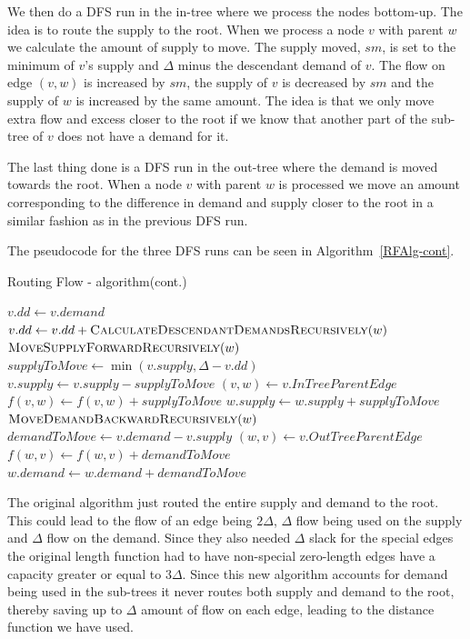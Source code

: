 We then do a DFS run in the in-tree where we process the nodes bottom-up. The idea is to route the supply to the root.
When we process a node $v$ with parent $w$ we calculate the amount of supply to move. The supply moved, $sm$, is set to 
the minimum of $v$'s supply and $\Delta$ minus the descendant demand of $v$. The flow on edge $(v,w)$ is increased by $sm$,
the supply of $v$ is decreased by $sm$ and the supply of $w$ is increased by the same amount. The idea is that
we only move extra flow and excess closer to the root if we know that another part of the sub-tree of $v$ does not have
a demand for it.

The last thing done is a DFS run in the out-tree where the demand is moved towards the root. When a node $v$ with parent $w$
is processed we move an amount corresponding to the difference in demand and supply closer to the root in a
similar fashion as in the previous DFS run.

The pseudocode for the three DFS runs can be seen in Algorithm~\ref{RFAlg-cont}.

\begin{algorithm}
\caption{Routing Flow - algorithm(cont.)}\label{RFAlg-cont}
\begin{algorithmic}[1]
\Statex
{}
	\State{}
	\State{}
	\State{}
\EndProcedure
\Statex
{}
	\State $v.dd \gets v.demand$
		\State $v.dd \gets v.dd + \Call{CalculateDescendantDemandsRecursively}{w}$
	\EndFor
\EndFunction
\Statex
{}
		\State $\Call{MoveSupplyForwardRecursively}{w}$
	\EndFor
	\State $supplyToMove \gets \min{(v.supply, \Delta - v.dd)}$
	\State $v.supply \gets v.supply - supplyToMove$
	\State $(v,w) \gets v.InTreeParentEdge$
	\State $f(v,w) \gets f(v,w) + supplyToMove$
	\State $w.supply \gets w.supply + supplyToMove$
\EndProcedure
\Statex
{}
		\State $\Call{MoveDemandBackwardRecursively}{w}$
	\EndFor
	\State $demandToMove \gets v.demand - v.supply$
	\State $(w,v) \gets v.OutTreeParentEdge$
	\State $f(w,v) \gets f(w,v) + demandToMove$
	\State $w.demand \gets w.demand + demandToMove$
\EndProcedure
\end{algorithmic}
\end{algorithm}
The original algorithm just routed the entire supply and demand to the root. This could lead to the flow of an edge being $2\Delta$, 
$\Delta$ flow being used on the supply and $\Delta$ flow on the demand. Since they also needed $\Delta$ slack for the special edges
the original length function had to have non-special zero-length edges have a capacity greater or equal to $3\Delta$. Since this new
algorithm accounts for demand being used in the sub-trees it never routes both supply and demand to the root, thereby saving
up to $\Delta$ amount of flow on each edge, leading to the distance function we have used.

